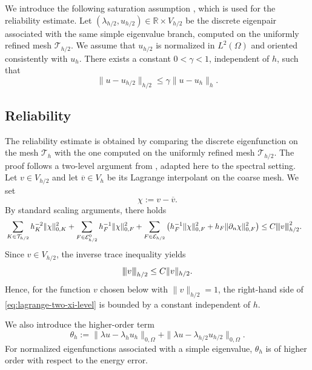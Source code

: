 \documentclass[onefignum,onetabnum,final]{siamart250211}
\numberwithin{equation}{section}
\newcommand\0{\boldsymbol{0}}
\newcommand\beps{\boldsymbol{\varepsilon}}
\newcommand\bu{\boldsymbol{u}}
\newcommand{\cblue}[1]{\textcolor{blue}{#1}}
\newcommand{\vertiii}[1]{{\left\vert\kern-0.25ex\left\vert\kern-0.25ex\left\vert #1 
		\right\vert\kern-0.25ex\right\vert\kern-0.25ex\right\vert}}
\begin{document}


We introduce the following saturation assumption \cite{braess1996posteriori}, which is used for the reliability estimate. Let $(\lambda_{h/2},u_{h/2})\in\mathbb{R}\times V_{h/2}$ be the discrete eigenpair associated with the same simple eigenvalue branch, computed on the uniformly refined mesh $\mathcal{T}_{h/2}$. We assume that $u_{h/2}$ is normalized in $L^2(\Omega)$ and oriented consistently with $u_h$. There exists a constant $0<\gamma<1$, independent of $h$, such that
\begin{equation}\label{satassum11}
   \|u-u_{h/2}\|_{h/2}\le \gamma\|u-u_h\|_{h}.
\end{equation}


\subsection{Reliability}

The reliability estimate is obtained by comparing the discrete eigenfunction on the mesh
$\mathcal T_h$ with the one computed on the uniformly refined mesh $\mathcal T_{h/2}$.
The proof follows a two-level argument from \cite{juntunen2009nitsche}, adapted here to the spectral setting. Let
$v\in V_{h/2}$ and let $\overline{v}\in V_h$ be its Lagrange interpolant on the coarse
mesh. We set
\[
   \chi:=v-\overline{v}.
\]
By standard scaling arguments, there holds
\begin{align}
&\sum_{K\in\mathcal T_{h/2}}h_K^{-2}\|\chi\|_{0,K}^2 + \sum_{F\in\mathcal E_{h/2}^0}h_F^{-1}\|\chi\|_{0,F}^2 +
\sum_{F\in\mathcal E_{h/2}} \left(h_F^{-1}\|\chi\|_{0,F}^2 + h_F\|\partial_n \chi\|_{0,F}^2 \right)\leq C \vertiii{v}_{h/2}^2.
\label{eq:lagrange-two-xi-level}
\end{align}
Since $v\in V_{h/2}$, the inverse trace inequality yields
\[
   \vertiii{v}_{h/2}\leq C\|v\|_{h/2}.
\]
Hence, for the function $v$ chosen below with $\|v\|_{h/2}=1$, the right-hand side
of \eqref{eq:lagrange-two-xi-level} is bounded by a constant independent of $h$.

We also introduce the higher-order term
\[
   \theta_h := \|\lambda u-\lambda_hu_h\|_{0,\Omega} + \|\lambda u-\lambda_{h/2}u_{h/2}\|_{0,\Omega}.
\]
For normalized eigenfunctions associated with a simple eigenvalue, $\theta_h$ is of
higher order with respect to the energy error.
\end{document}
